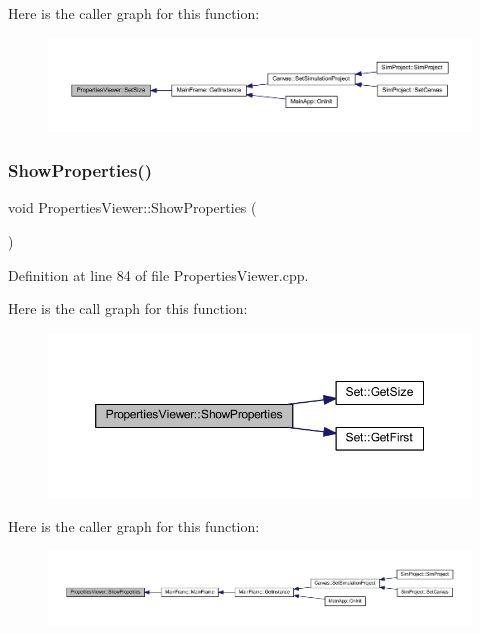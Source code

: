 Here is the caller graph for this function\+:
\nopagebreak
\begin{figure}[H]
\begin{center}
\leavevmode
\includegraphics[width=350pt]{class_properties_viewer_a584378c78158525069fccc64ba446821_icgraph}
\end{center}
\end{figure}
\mbox{\label{class_properties_viewer_a728c21d8325941bfcee2599ea9edd9bc}} 
\subsubsection{\texorpdfstring{Show\+Properties()}{ShowProperties()}}
{\footnotesize\ttfamily void Properties\+Viewer\+::\+Show\+Properties (\begin{DoxyParamCaption}{ }\end{DoxyParamCaption})}



Definition at line 84 of file Properties\+Viewer.\+cpp.

Here is the call graph for this function\+:
\nopagebreak
\begin{figure}[H]
\begin{center}
\leavevmode
\includegraphics[width=350pt]{class_properties_viewer_a728c21d8325941bfcee2599ea9edd9bc_cgraph}
\end{center}
\end{figure}
Here is the caller graph for this function\+:
\nopagebreak
\begin{figure}[H]
\begin{center}
\leavevmode
\includegraphics[width=350pt]{class_properties_viewer_a728c21d8325941bfcee2599ea9edd9bc_icgraph}
\end{center}
\end{figure}


